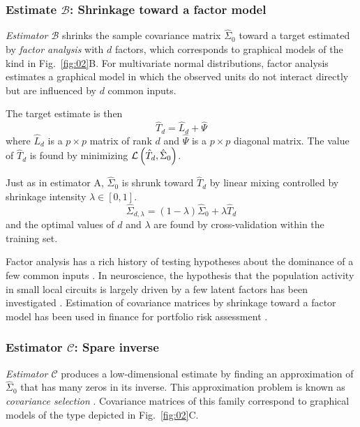 \subsubsection*{Estimate $\mathcal B$: Shrinkage toward a factor model}
\emph{Estimator $\mathcal B$} shrinks the sample covariance matrix $\hat\Sigma_0$ toward a target estimated by \emph{factor analysis} with $d$ factors, which corresponds to graphical models of the kind in Fig.~\ref{fig:02}B. For multivariate normal distributions, factor analysis estimates a graphical model in which the observed units do not interact directly but are influenced by $d$ common inputs.

The target estimate is then 
\begin{equation}
\hat T_d = \hat L_d + \hat \Psi
\end{equation}
where $\hat L_d$ is a $p\times p$ matrix of rank $d$ and $\hat \Psi$ is a $p\times p$ diagonal matrix. The value of $\hat T_d$ is found by minimizing $\mathcal L\left(\hat T_d, \hat\Sigma_0\right)$.

Just as in estimator A, $\hat\Sigma_0$ is shrunk toward $\hat T_d$ by linear mixing controlled by shrinkage intensity $\lambda\in[0,1]$.
\begin{equation}
\hat\Sigma_{d,\lambda} = (1-\lambda)\hat\Sigma_0 + \lambda\hat T_d
\end{equation}
and the optimal values of $d$ and $\lambda$ are found by cross-validation within the training set.

Factor analysis has a rich history of testing hypotheses about the dominance of a few common inputs \cite{findagoodone}.  In neuroscience, the hypothesis that the population activity in small local circuits is largely driven by a few latent factors has been investigated \cite{Yu:2009,Ecker:2013}.  Estimation of covariance matrices by shrinkage toward a factor model has been used in finance for portfolio risk assessment \cite{Ledoit:2003,Fan:2008}.

\subsubsection*{Estimator $\mathcal C$: Spare inverse}
\emph{Estimator $\mathcal C$} produces a low-dimensional estimate by finding an approximation of $\hat\Sigma_0$ that has many zeros in its inverse. This approximation problem is known as \emph{covariance selection} \cite{Dempster:1972}.  Covariance matrices of this family correspond to graphical models of the type depicted in Fig.~\ref{fig:02}C.

